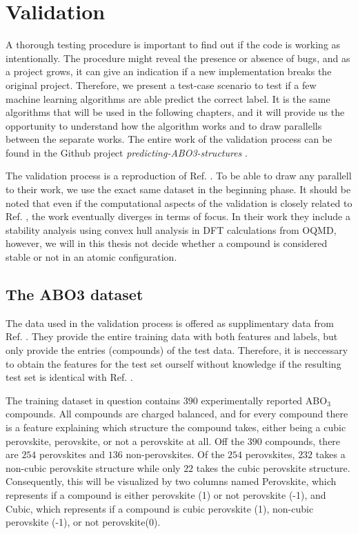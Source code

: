 \chapter{Validation}

A thorough testing procedure is important to find out if the code is working as intentionally. The procedure might reveal the presence or absence of bugs, and as a project grows, it can give an indication if a new implementation breaks the original project. Therefore, we present a test-case scenario to test if a few machine learning algorithms are able predict the correct label. It is the same algorithms that will be used in the following chapters, and it will provide us the opportunity to understand how the algorithm works and to draw parallells between the separate works. The entire work of the validation process can be found in the Github project \textit{predicting-ABO3-structures} \cite{Ohebbi2021a}.

The validation process is a reproduction of Ref. \cite{Balachandran2018}. To be able to draw any parallell to their work, we use the exact same dataset in the beginning phase. It should be noted that even if the computational aspects of the validation is closely related to Ref. \cite{Balachandran2018}, the work eventually diverges in terms of focus. In their work they include a stability analysis using convex hull analysis in DFT calculations from OQMD, however, we will in this thesis not decide whether a compound is considered stable or not in an atomic configuration.

\section{The ABO3 dataset}

The data used in the validation process is offered as supplimentary data from Ref. \cite{Balachandran2018}. They provide the entire training data with both features and labels, but only provide the entries (compounds) of the test data. Therefore, it is neccessary to obtain the features for the test set ourself without knowledge if the resulting test set is identical with Ref. \cite{Balachandran2018}.

The training dataset in question contains $390$ experimentally reported ABO$_3$ compounds. All compounds are charged balanced, and for every compound there is a feature explaining which structure the compound takes, either being a cubic perovskite, perovskite, or not a perovskite at all. Off the $390$ compounds, there are $254$ perovskites and $136$ non-perovskites. Of the $254$ perovskites, $232$ takes a non-cubic perovskite structure while only $22$ takes the cubic perovskite structure. Consequently, this will be visualized by two columns named Perovskite, which represents if a compound is either perovskite (1) or not perovskite (-1), and Cubic, which represents if a compound is cubic perovskite (1), non-cubic perovskite (-1), or not perovskite(0).

